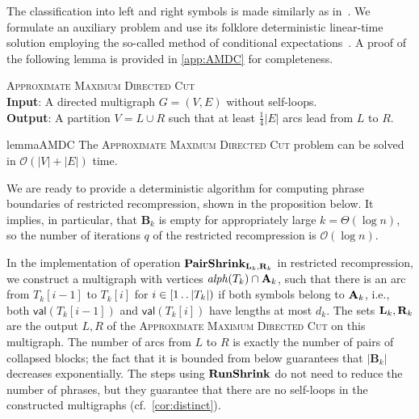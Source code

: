 \documentclass[a4paper]{article}
\theoremstyle{definition}
\theoremstyle{remark}
\newcommand{\B}{\mathbf{B}}
\newcommand{\dd}{\mathinner{\ldotp\ldotp}}
\newcommand{\val}{\mathsf{val}}
\newcommand{\aalph}{\mathit{alph}}
\newcommand{\Oh}{\mathcal{O}}
\newenvironment{dsproblem}[1]
{\begin{center}\begin{lrbox}{\mybox}\begin{minipage}{0.96\columnwidth}{\textsc{#1}}\\}
{\end{minipage}\end{lrbox}\fbox{\usebox{\mybox}}\end{center}}
\newcommand{\defdsproblem}[2]{
  \begin{dsproblem}{#1}
#2
  \end{dsproblem}
  }
\begin{document}
The classification into left and right symbols is made similarly as in~\cite[Lemma 6.2]{DBLP:journals/talg/Jez15}.
We formulate an auxiliary problem and use its folklore deterministic linear-time solution employing the so-called method of conditional expectations~\cite[Section 6.3]{MU05}.
A proof of the following lemma is provided in \cref{app:AMDC} for completeness.

\defdsproblem{\textsc{Approximate Maximum Directed Cut}}{
\textbf{Input}: A directed multigraph $G=(V,E)$ without self-loops.\\
\textbf{Output}:
A partition $V = L\cup R$ such that at least $\tfrac14|E|$ arcs lead from $L$ to $R$.
}

\begin{restatable}{lemma}{AMDC}
\label{lem:maxcut}
The \textsc{Approximate Maximum Directed Cut} problem can be solved in $\Oh(|V|+|E|)$ time.
\end{restatable}

We are ready to provide a deterministic algorithm for computing phrase boundaries of restricted recompression, shown in the proposition below.
It implies, in particular, that $\B_k$ is empty for appropriately large $k=\Theta(\log n)$, so the number of iterations $q$
of the restricted recompression is $\Oh(\log n)$.

In the implementation of operation $\mathsf{\mathbf{PairShrink}}_{\mathbf{L}_{k},\mathbf{R}_{k}}$ in restricted recompression, we construct a multigraph with vertices
$\aalph(T_k)\cap \Act_k$, such that there is an arc from $T_k[i-1]$ to $T_k[i]$ for $i \in [1 \dd |T_k|)$ if both symbols belong to $\mathbf{A}_k$, i.e., both $\val(T_k[i-1])$ and $\val(T_k[i])$ have lengths at most $d_k$.
The sets $\mathbf{L}_k, \mathbf{R}_k$ are the output $L,R$ of the \textsc{Approximate Maximum Directed Cut} on this multigraph.
The number of arcs from $L$ to $R$ is exactly the number of pairs of collapsed blocks; the fact that it is bounded from below
guarantees that $|\B_k|$ decreases exponentially.
The steps using $\mathsf{\mathbf{RunShrink}}$ do not need to reduce the number of phrases, but they guarantee that there are no self-loops in the constructed multigraphs
(cf.\ \cref{cor:distinct}).
\end{document}
